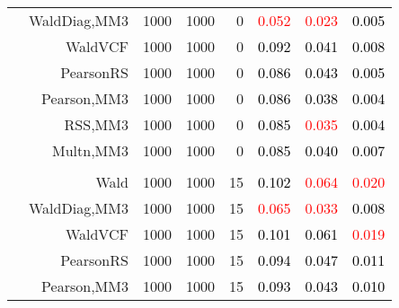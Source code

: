 \documentclass[
]{article}
\begin{document}
\begin{table}[H]
{\begin{tabular}[t]{lrrrrrrr}
\hspace{1em} & WaldDiag,MM3 & 1000 & 1000 & 0 & \textcolor{red}{0.052} & \textcolor{red}{0.023} & \textcolor{black}{0.005}\\

\hspace{1em} & WaldVCF & 1000 & 1000 & 0 & \textcolor{black}{0.092} & \textcolor{black}{0.041} & \textcolor{black}{0.008}\\

\hspace{1em} & PearsonRS & 1000 & 1000 & 0 & \textcolor{black}{0.086} & \textcolor{black}{0.043} & \textcolor{black}{0.005}\\

\hspace{1em} & Pearson,MM3 & 1000 & 1000 & 0 & \textcolor{black}{0.086} & \textcolor{black}{0.038} & \textcolor{black}{0.004}\\

\hspace{1em} & RSS,MM3 & 1000 & 1000 & 0 & \textcolor{black}{0.085} & \textcolor{red}{0.035} & \textcolor{black}{0.004}\\

\hspace{1em} & Multn,MM3 & 1000 & 1000 & 0 & \textcolor{black}{0.085} & \textcolor{black}{0.040} & \textcolor{black}{0.007}\\
\cmidrule{1-8}
\addlinespace[0.3em]
\multicolumn{8}{l}{\textbf{1F 15V}}\\
\hspace{1em} & Wald & 1000 & 1000 & 15 & \textcolor{black}{0.102} & \textcolor{red}{0.064} & \textcolor{red}{0.020}\\

\hspace{1em} & WaldDiag,MM3 & 1000 & 1000 & 15 & \textcolor{red}{0.065} & \textcolor{red}{0.033} & \textcolor{black}{0.008}\\

\hspace{1em} & WaldVCF & 1000 & 1000 & 15 & \textcolor{black}{0.101} & \textcolor{black}{0.061} & \textcolor{red}{0.019}\\

\hspace{1em} & PearsonRS & 1000 & 1000 & 15 & \textcolor{black}{0.094} & \textcolor{black}{0.047} & \textcolor{black}{0.011}\\

\hspace{1em} & Pearson,MM3 & 1000 & 1000 & 15 & \textcolor{black}{0.093} & \textcolor{black}{0.043} & \textcolor{black}{0.010}\\


\end{tabular}}
\end{table}
\end{document}
